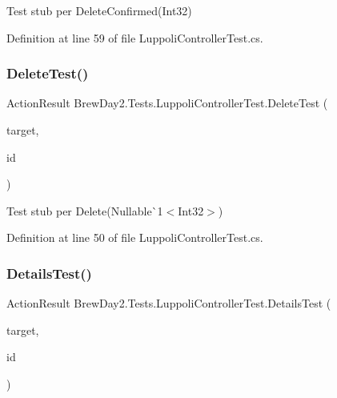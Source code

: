 Test stub per Delete\+Confirmed(\+Int32)



Definition at line 59 of file Luppoli\+Controller\+Test.\+cs.

\mbox{\label{class_brew_day2_1_1_tests_1_1_luppoli_controller_test_a44d3f1c5b074f54ce2239f4160008ed3}} 
\subsubsection{\texorpdfstring{Delete\+Test()}{DeleteTest()}}
{\footnotesize\ttfamily Action\+Result Brew\+Day2.\+Tests.\+Luppoli\+Controller\+Test.\+Delete\+Test (\begin{DoxyParamCaption}\item[{\mbox{[}\+Pex\+Assume\+Under\+Test\mbox{]} \mbox{\hyperlink{class_brew_day2_1_1_controllers_1_1_luppoli_controller}{Luppoli\+Controller}}}]{target,  }\item[{int?}]{id }\end{DoxyParamCaption})}



Test stub per Delete(Nullable\`{}1$<$Int32$>$)



Definition at line 50 of file Luppoli\+Controller\+Test.\+cs.

\mbox{\label{class_brew_day2_1_1_tests_1_1_luppoli_controller_test_add00e771366bfdde1deb44292402e1ac}} 
\subsubsection{\texorpdfstring{Details\+Test()}{DetailsTest()}}
{\footnotesize\ttfamily Action\+Result Brew\+Day2.\+Tests.\+Luppoli\+Controller\+Test.\+Details\+Test (\begin{DoxyParamCaption}\item[{\mbox{[}\+Pex\+Assume\+Under\+Test\mbox{]} \mbox{\hyperlink{class_brew_day2_1_1_controllers_1_1_luppoli_controller}{Luppoli\+Controller}}}]{target,  }\item[{int?}]{id }\end{DoxyParamCaption})}



